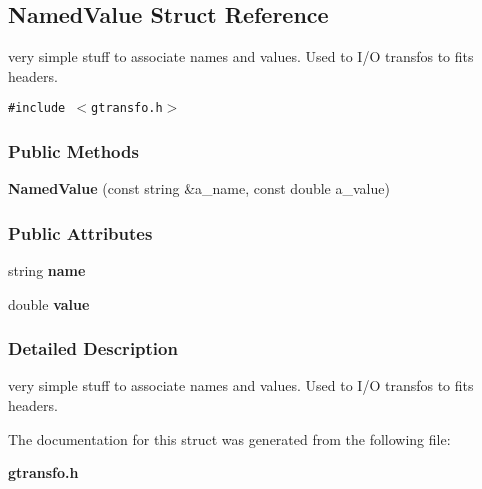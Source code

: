 \subsection{Named\-Value  Struct Reference}
\label{struct_namedvalue}
very simple stuff to associate names and values. Used to I/O transfos to fits headers. 


{\tt \#include $<$gtransfo.h$>$}

\subsubsection*{Public Methods}
\begin{CompactItemize}
\item 
{}
{\bf Named\-Value} (const string \&a\_\-name, const double a\_\-value)\label{struct_namedvalue_a0}

\end{CompactItemize}
\subsubsection*{Public Attributes}
\begin{CompactItemize}
\item 
{}
string {\bf name}\label{struct_namedvalue_m0}

\item 
{}
double {\bf value}\label{struct_namedvalue_m1}

\end{CompactItemize}


\subsubsection{Detailed Description}
very simple stuff to associate names and values. Used to I/O transfos to fits headers.



The documentation for this struct was generated from the following file:\begin{CompactItemize}
\item 
{\bf gtransfo.h}\end{CompactItemize}
